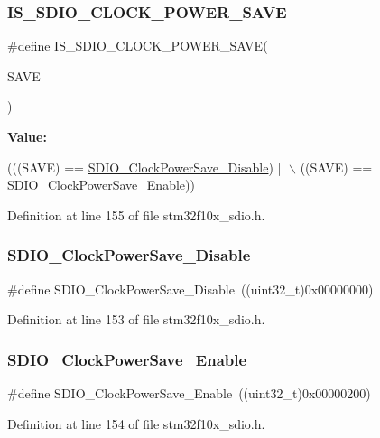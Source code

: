\subsubsection{\texorpdfstring{I\+S\+\_\+\+S\+D\+I\+O\+\_\+\+C\+L\+O\+C\+K\+\_\+\+P\+O\+W\+E\+R\+\_\+\+S\+A\+VE}{IS\_SDIO\_CLOCK\_POWER\_SAVE}}
{\footnotesize\ttfamily \#define I\+S\+\_\+\+S\+D\+I\+O\+\_\+\+C\+L\+O\+C\+K\+\_\+\+P\+O\+W\+E\+R\+\_\+\+S\+A\+VE(\begin{DoxyParamCaption}\item[{}]{S\+A\+VE }\end{DoxyParamCaption})}

{\bfseries Value\+:}
\begin{DoxyCode}
(((SAVE) == \hyperlink{group___s_d_i_o___clock___power___save_ga032aa5fb2dfd7ba5dbd60a3845c82ba0}{SDIO\_ClockPowerSave\_Disable}) || \(\backslash\)
                                        ((SAVE) == \hyperlink{group___s_d_i_o___clock___power___save_ga9f5b66a0044c4ff36a3eb1ec758f7ea7}{SDIO\_ClockPowerSave\_Enable}))
\end{DoxyCode}


Definition at line 155 of file stm32f10x\+\_\+sdio.\+h.

\mbox{\label{group___s_d_i_o___clock___power___save_ga032aa5fb2dfd7ba5dbd60a3845c82ba0}} 
\subsubsection{\texorpdfstring{S\+D\+I\+O\+\_\+\+Clock\+Power\+Save\+\_\+\+Disable}{SDIO\_ClockPowerSave\_Disable}}
{\footnotesize\ttfamily \#define S\+D\+I\+O\+\_\+\+Clock\+Power\+Save\+\_\+\+Disable~((uint32\+\_\+t)0x00000000)}



Definition at line 153 of file stm32f10x\+\_\+sdio.\+h.

\mbox{\label{group___s_d_i_o___clock___power___save_ga9f5b66a0044c4ff36a3eb1ec758f7ea7}} 
\subsubsection{\texorpdfstring{S\+D\+I\+O\+\_\+\+Clock\+Power\+Save\+\_\+\+Enable}{SDIO\_ClockPowerSave\_Enable}}
{\footnotesize\ttfamily \#define S\+D\+I\+O\+\_\+\+Clock\+Power\+Save\+\_\+\+Enable~((uint32\+\_\+t)0x00000200)}



Definition at line 154 of file stm32f10x\+\_\+sdio.\+h.

